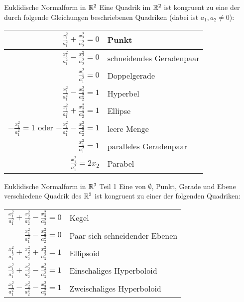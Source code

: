\documentclass[main.tex]{subfiles}
\begin{document}
\begin{karte}{Euklidische Normalform in \(\mathbb{R}^2\)}
    Eine Quadrik im \( \mathbb{R}^2 \) ist kongruent zu 
    eine der durch folgende Gleichungen 
    beschriebenen Quadriken (dabei ist \(a_1, a_2 \neq 0\)):\\
    {\renewcommand{\arraystretch}{1.5}
    \begin{center}
        \begin{tabular}{|r|l|}
            \hline
            \( \frac{x_1^2}{a_1^2} + \frac{x_2^2}{a_2^2} = 0 \) & Punkt \\
            \hline
            \( \frac{x_1^2}{a_1^2} - \frac{x_2^2}{a_2^2} = 0 \) & schneidendes Geradenpaar \\
            \hline
            \( \frac{x_1^2}{a_1^2} = 0 \) & Doppelgerade \\
            \hline
            \( \frac{x_1^2}{a_1^2} - \frac{x_2^2}{a_2^2} = 1 \) & Hyperbel \\
            \hline 
            \( \frac{x_1^2}{a_1^2} + \frac{x_2^2}{a_2^2} = 1 \) & Ellipse \\
            \hline 
            \( - \frac{x_1^2}{a_1^2} = 1 \) oder \( - \frac{x_1^2}{a_1^2} - \frac{x_2^2}{a_2^2} = 1 \) & leere Menge \\
            \hline 
            \( \frac{x_1^2}{a_1^2} = 1 \) & paralleles Geradenpaar \\
            \hline 
            \( \frac{x_1^2}{a_1^2} = 2x_2 \) & Parabel \\
            \hline
        \end{tabular}
    \end{center}}
\end{karte}

\begin{karte}{Euklidische Normalform in \( \mathbb{R}^3 \) Teil 1}
    Eine von \( \emptyset \), Punkt, Gerade und Ebene verschiedene Quadrik des 
    \( \mathbb{R}^3 \) ist kongruent zu einer der folgenden Quadriken: 
    {\renewcommand{\arraystretch}{1.5}
    \begin{center}
    \begin{tabular}{|r|l|}
        \hline
        \( \frac{x_1^2}{a_1^2} + \frac{x_2^2}{a_2^2} - \frac{x_3^2}{a_3^2} = 0 \) & Kegel \\
        \( \frac{x_1^2}{a_1^2} - \frac{x_2^2}{a_2^2} = 0 \) & Paar sich schneidender Ebenen \\
        \hline 
        \( \frac{x_1^2}{a_1^2} + \frac{x_2^2}{a_2^2} + \frac{x_3^2}{a_3^2} = 1 \) & Ellipsoid \\
        \( \frac{x_1^2}{a_1^2} + \frac{x_2^2}{a_2^2} - \frac{x_3^2}{a_3^2} = 1 \) & Einschaliges Hyperboloid \\
        \( \frac{x_1^2}{a_1^2} - \frac{x_2^2}{a_2^2} - \frac{x_3^2}{a_3^2} = 1 \) & Zweischaliges Hyperboloid \\
        \hline
    \end{tabular}
    \end{center}}
\end{karte}
\end{document}
